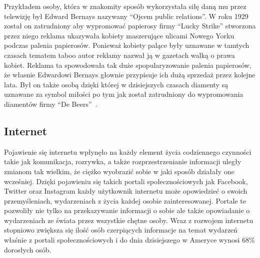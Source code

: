 Przykładem osoby, która w znakomity sposób wykorzystała siłę daną mu przez telewizję był Edward Bernays
nazywany ``Ojcem public relations''.
W roku 1929 został on zatrudniony aby wypromować papierosy firmy ``Lucky Strike''
stworzona przez niego reklama ukazywała kobiety maszerujące ulicami Nowego Yorku
podczas palenia papierosów. Ponieważ kobiety palące były uznawane w tamtych czasach tematem
taboo autor reklamy nazwał ją w gazetach walką o prawa kobiet. Reklama ta spowodowała tak duże 
spopularyzowanie palenia papierosów, że własnie Edwardowi Bernays głownie przypisuje
ich dużą sprzedaż przez kolejne lata.
Był on także osobą dzięki której w dzisiejszych czasach diamenty są uznawane za symbol miłości po tym jak
został zatrudniony do wypromowania diamentów firmy ``De Beers''~\cite{MarkDice}.

\subsection{Internet}
Pojawienie się internetu wpłynęło na każdy element życia codziennego czynności takie jak komunikacja, rozrywka,
a także rozprzestrzenianie informacji uległy zmianom tak wielkim, że ciężko wyobrazić sobie w jaki sposób działały
one wcześniej. Dzięki pojawieniu się takich portali społecznościowych jak Facebook, Twitter oraz Instagram każdy użytkownik
internetu może opowiedzieć o swoich przemyśleniach, wydarzeniach z życia każdej osobie zainteresowanej. Portale te
pozwoliły nie tylko na przekazywanie informacji o sobie ale także opowiadanie o wydarzeniach ze świata przez wszystkie
chętne osoby. Wraz z rozwojem internetu stopniowo zwiększa się ilość osób czerpiących informacje na temat wydarzeń
właśnie z portali społecznościowych i do dnia dzisiejszego w Ameryce wynosi 68\% dorosłych osób. 

